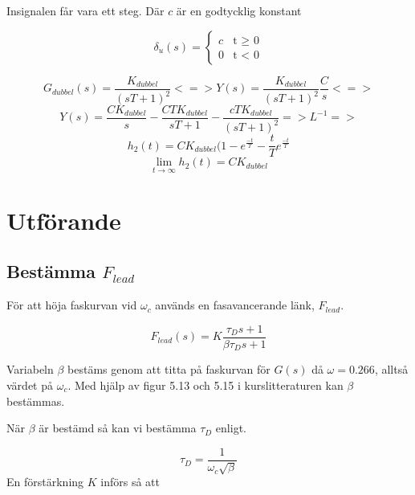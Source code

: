 \documentclass[a4paper]{article}
\begin{document}
Insignalen får vara ett steg. Där $c$ är en godtycklig konstant

\begin{equation*}
\delta_{u}(s)=\begin{cases}
  c & \text{t $\geq$ 0}  \\
  0 & \text{t $<$ 0} 
\end{cases}
\end{equation*}


\begin{equation*}
  G_{dubbel}(s)=\frac{K_{dubbel}}{(sT+1)^2} <=> Y(s)=\frac{K_{dubbel}}{(sT+1)^2} \frac{C}{s} <=>
\end{equation*}
\begin{equation*}
  Y(s)=\frac{CK_{dubbel}}{s}-\frac{CTK_{dubbel}}{sT+1}-\frac{cTK_{dubbel}}{(sT+1)^2} => L^{-1} =>
\end{equation*}
\begin{equation}
  h_{2}(t)=CK_{dubbel}(1-e^{\frac{-t}{T}}-\frac{t}{T}e^{\frac{-t}{T}}
\end{equation}
\begin{equation}
  \lim_{t \to \infty} h_{2}(t)=CK_{dubbel}
\end{equation}


\section{Utförande}



\subsection{Bestämma $F_{lead}$}

För att höja faskurvan vid $\omega_{c}$ används en fasavancerande länk, $F_{lead}$.

\begin{equation}
  F_{lead}(s)=K\frac{\tau_{D}s+1}{\beta\tau_{D}s+1}
\end{equation}

Variabeln $\beta$ bestäms genom att titta på faskurvan för $G(s)$ då $\omega = 0.266$, alltså värdet på $\omega_c$. 
Med hjälp av figur 5.13 och 5.15 i kurslitteraturen \cite{kb} kan $\beta$ bestämmas.

När $\beta$ är bestämd så kan vi bestämma $\tau_D$ enligt.

\begin{equation}
  \tau_D=\frac{1}{\omega_c\sqrt{\beta}}
\end{equation}
En förstärkning $K$ införs så att 
\end{document}
